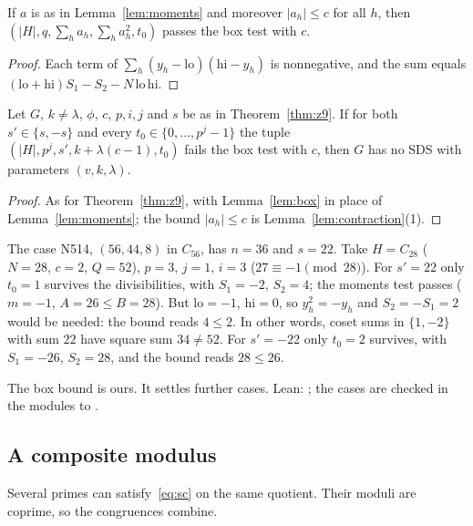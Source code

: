 \begin{lemma}\label{lem:box}
If $a$ is as in Lemma~\ref{lem:moments} and moreover $|a_h| \le c$ for all $h$, then
$(|H|, q, \sum_h a_h, \sum_h a_h^2, t_0)$ passes the box test with $c$.
\end{lemma}

\begin{proof}
Each term of $\sum_h (y_h - \mathrm{lo})(\mathrm{hi} - y_h)$ is nonnegative, and the sum equals
$(\mathrm{lo} + \mathrm{hi}) S_1 - S_2 - N\,\mathrm{lo}\,\mathrm{hi}$.
\end{proof}

\begin{theorem}\label{thm:z10}
Let $G$, $k \neq \lambda$, $\phi$, $c$, $p, i, j$ and $s$ be as in Theorem~\ref{thm:z9}. If
for both $s' \in \{s, -s\}$ and every $t_0 \in \{0, \dots, p^j - 1\}$ the tuple
$(|H|, p^j, s', k + \lambda(c-1), t_0)$ fails the box test with $c$, then $G$ has no SDS with
parameters $(v,k,\lambda)$.
\end{theorem}

\begin{proof}
As for Theorem~\ref{thm:z9}, with Lemma~\ref{lem:box} in place of Lemma~\ref{lem:moments};
the bound $|a_h| \le c$ is Lemma~\ref{lem:contraction}(1).
\end{proof}

\begin{example}
The case N514, $(56, 44, 8)$ in $C_{56}$, has $n = 36$ and $s = 22$. Take $H = C_{28}$
($N = 28$, $c = 2$, $Q = 52$), $p = 3$, $j = 1$, $i = 3$ ($27 \equiv -1 \pmod{28}$). For
$s' = 22$ only $t_0 = 1$ survives the divisibilities, with $S_1 = -2$, $S_2 = 4$; the moments
test passes ($m = -1$, $A = 26 \le B = 28$). But $\mathrm{lo} = -1$, $\mathrm{hi} = 0$, so
$y_h^2 = -y_h$ and $S_2 = -S_1 = 2$ would be needed: the bound reads $4 \le 2$. In other words,
coset sums in $\{1, -2\}$ with sum $22$ have square sum $34 \ne 52$. For $s' = -22$ only
$t_0 = 2$ survives, with $S_1 = -26$, $S_2 = 28$, and the bound reads $28 \le 26$.
\end{example}

\begin{remark}
The box bound is ours. It settles  further cases. Lean:
; the cases are checked in the modules
 to .
\end{remark}

\subsection{A composite modulus}
Several primes can satisfy~\eqref{eq:sc} on the same quotient. Their moduli are coprime, so
the congruences combine.

